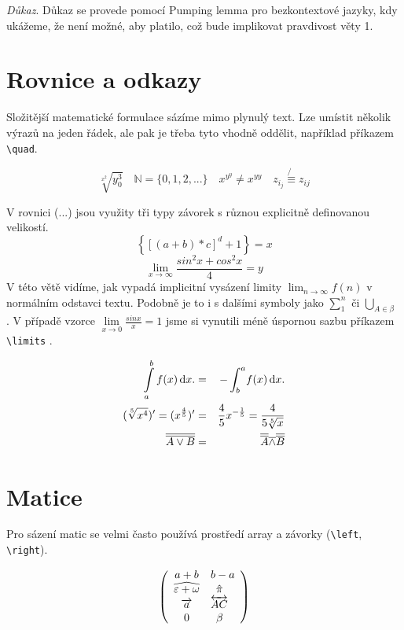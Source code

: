 \documentclass[a4paper, twocolumn, 11pt]{article}
\theoremstyle{definition}
\begin{document}
\noindent \textit{Důkaz}. Důkaz se provede pomocí Pumping lemma pro bezkontextové jazyky, kdy ukážeme, že není možné, aby platilo, což bude implikovat pravdivost věty  1. %

\section{Rovnice a odkazy}
Složitější matematické formulace sázíme mimo plynulý text. Lze umístit několik výrazů na jeden řádek, ale pak je třeba tyto vhodně oddělit, například příkazem \texttt{{\textbackslash}quad}. 

$$\sqrt[x^{2}]{y^{3}_0} \quad \mathbb{N} = \{0, 1 ,2,...\} \quad x^{y^{y}} \neq x^{yy} \quad z_{i_{j}} \not{\equiv} z_{ij}$$

V rovnici (...) jsou využity tři typy závorek s různou explicitně definovanou velikostí.
\setcounter{equation}{0}
\label{eq}\begin{equation}
\left\{ \left[(a + b) * c \right]^{d} +1 \right\} = x
\end{equation}
\begin{equation*}
\lim_{x\to \infty} \frac{sin^{2}x + cos^{2}x}{4} = y 
\end{equation*}
V této větě vidíme, jak vypadá implicitní vysázení limity $\lim_{n\to \infty}f(n)$ v normálním odstavci textu. Podobně je to i s dalšími symboly jako $\sum _{1}^n$ či ${\bigcup}_{A{\in}\beta}$ . V případě vzorce $\lim\limits_{x \to 0} \frac{sin x}{x} =1$ jsme si vynutili méně úspornou sazbu příkazem \texttt{{\textbackslash}limits} .

\begin{eqnarray}
\int_a^b\limits f(x) \, \mathrm{d}x. &=& -\int_b^a \! f(x) \, \mathrm{d}x. \\
(\sqrt[5]{x^4})' = (x^{\frac{4}{5}})' &=& \frac{4}{5}x^{-\frac{1}{5}} = \frac{4}{5\sqrt[5]{x}}\\
\overline{\overline{A \vee B}} &=& \overline{\overline{A}} \overline{\wedge} \overline{\overline{B}}
\end{eqnarray}

\section{Matice}

Pro sázení matic se velmi často používá prostředí array a závorky (\texttt{{\textbackslash}left}, \texttt{{\textbackslash}right}).


$$\left(
\begin{array}{c l}
a + b & b - a \\
\widehat{\varepsilon + \omega} & \enspace \hat{\pi} \\
\overrightarrow{a} & \overleftrightarrow{AC}\\
0 & \enspace \beta
\end{array} \right)
$$
\end{document}
